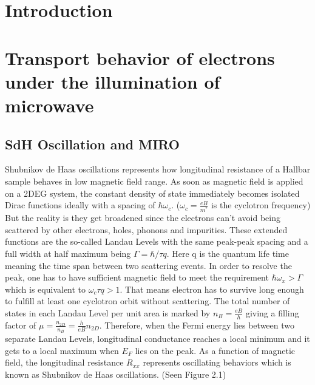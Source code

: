 \documentclass[12pt]{ruthesis}
\begin{document}
\chapter{Introduction}\label{Intro}


\chapter{Transport behavior of electrons under the illumination of microwave}\label{Transport}

\section{SdH Oscillation and MIRO}\label{SdHO}
Shubnikov de Haas oscillations represents how longitudinal resistance of a Hallbar sample behaves in low magnetic field range. As soon as magnetic field is applied on a 2DEG system, the constant density of state immediately becomes isolated Dirac functions ideally with a spacing of $\hbar\omega_{c}$. ($\omega_{c}=\frac{eB}{m^{*}}$ is the cyclotron frequency) But the reality is they get broadened since the electrons can't avoid being scattered by other electrons, holes, phonons and impurities. These extended functions are the so-called Landau Levels with the same peak-peak spacing and a full width at half maximum being $\Gamma=\hbar/\tau q$. Here q is the quantum life time meaning the time span between two scattering events. In order to resolve the peak, one has to have sufficient magnetic field to meet the requirement $\hbar\omega_{x}>\Gamma$ which is equivalent to $\omega_{c}\tau q>1$. That means electron has to survive long enough to fulfill at least one cyclotron orbit without scattering. The total number of states in each Landau Level per unit area is marked by $n_{B}=\frac{eB}{h}$ giving a filling factor of $\mu =\frac{n_{2D}}{n_{B}}=\frac{h}{eB}n_{2D}$. Therefore, when the Fermi energy lies between two separate Landau Levels, longitudinal conductance reaches a local minimum and it gets to a local maximum when $E_{F}$ lies on the peak. As a function of magnetic field, the longitudinal resistance $R_{xx}$ represents oscillating behaviors which is known as Shubnikov de Haas oscillations. (Seen Figure 2.1)
\end{document}
